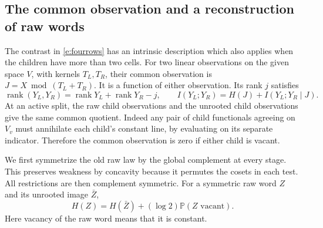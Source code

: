\documentclass[11pt]{article}
\numberwithin{equation}{section}
\newcommand{\PP}{\mathbb P}
\DeclareMathOperator{\rank}{rank}
\begin{document}
\subsection{The common observation and a reconstruction of raw words}

The contrast in \eqref{e:fourrows} has an intrinsic description
which also applies when the children have more than two cells.
For two linear observations on the given space $V$, with kernels
$T_L,T_R$, their common observation is $J=X\bmod(T_L+T_R)$.
It is a function of either observation. Its rank $j$ satisfies
\[
  \rank(Y_L,Y_R)=\rank Y_L+\rank Y_R-j,\qquad
  I(Y_L;Y_R)=H(J)+I(Y_L;Y_R\mid J).
\]
At an active split, the raw child observations and the unrooted
child observations give the same common quotient. Indeed any pair
of child functionals agreeing on $V_v$ must annihilate each child's
constant line, by evaluating on its separate indicator. Therefore
the common observation is zero if either child is vacant.

We first symmetrize the old raw law by the global complement at
every stage. This preserves weakness by concavity because it
permutes the cosets in each test. All restrictions are then
complement symmetric. For a symmetric raw word $Z$ and its
unrooted image $\bar Z$,
\begin{equation}
             H(Z)=H(\bar Z)+(\log2)\PP(Z\text{ vacant}).
 \label{e:raw}
\end{equation}
Here vacancy of the raw word means that it is constant.
\end{document}
